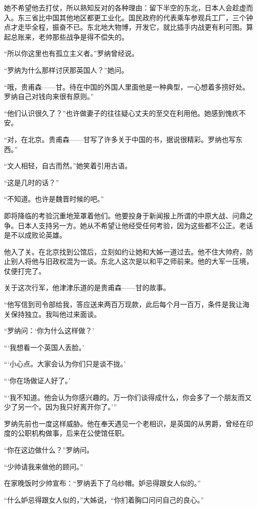 \par 她不希望他去打仗，所以熟知反对的各种理由：留下半空的东北，日本人会趁虚而入。东三省比中国其他地区都更工业化。国民政府的代表乘车参观兵工厂，三个钟点才走毕全程，振奋不已。东北地大物博，开发它，就比插手内战更有利可图。算起总账来，老帅那些战争是得不偿失的。
\par “所以你这里也有孤立主义者。”罗纳曾经说。
\par “罗纳为什么那样讨厌那英国人？”她问。
\par “哦，贵甫森——甘。待在中国的外国人里面他是一种典型，一心想着多捞好处。罗纳自己对钱向来很有原则。”
\par “他们认识很久了？”也许做妻子的往往疑心丈夫的至交在利用他。她感到愧疚不安。
\par “对，在北京。贵甫森——甘写了许多关于中国的书，据说很精彩。罗纳也写东西。”
\par “文人相轻，自古而然。”她笑着引用古语。
\par “这是几时的话？”
\par “不知道。也许是魏晋时候的吧。”
\par 即将降临的考验沉重地笼罩着他们。他要投身于新闻报上所谓的中原大战、问鼎之争。日本人支持另一方。她从不希望让他经受任何考验，因为这些都不公正。老话是不以成败论英雄。
\par 他入了关。在北京找到公馆后，立刻如约让她和大姊一道过去。他不住大帅府，防止别人将他与旧政权混为一谈。东北人这次是以和平之师前来。他的大军一压境，仗便打完了。
\par 关于这次行军，他津津乐道的是贵甫森——甘的故事。
\par “他写信到司令部给我，答应送来两百万现款，此后每个月一百万，条件是我让海关保持独立。我叫他过来面谈。
\par “罗纳问：‘你为什么这样做？’
\par “‘我想看一个英国人丢脸。’
\par “‘小心点。大家会认为你们只是谈不拢。’
\par “‘你在场做证人好了。’
\par “‘我不知道。他会认为你感兴趣的。万一你们谈得成什么，你会多了一个朋友而又少了另一个。因为我只好离开你了。’”
\par 罗纳先前也一度这样威胁。他在奉天遇见一个老相识，是英国的从男爵，曾经在印度的公职机构做事，后来在公使馆任职。
\par “你在这边做什么？”罗纳问。
\par “少帅请我来做他的顾问。”
\par 在家晚饭时少帅宣布：“罗纳丢下了乌纱帽。妒忌得跟女人似的。”
\par “什么妒忌得跟女人似的，”大姊说，“你扪着胸口问问自己的良心。”
